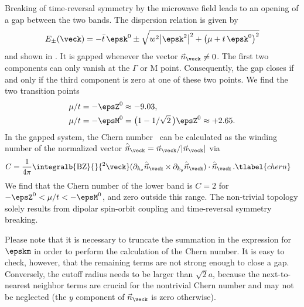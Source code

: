 Breaking of time-reversal symmetry by the microwave field leads to an opening of a gap between the two bands.
The dispersion relation is given by
\begin{align}
    E_\pm(\veck)=- \bar{t}\, \epsk^0 \pm \sqrt{w^2 \big|\epsk^2\big|^2+\big(\mu+t\, \epsk^0\big)^2}
\end{align}
and shown in .
It is gapped whenever the vector $\vec{n}_{\veck}\ne 0$.
The first two components can only vanish at the $\Gamma$ or $\text{M}$ point.
Consequently, the gap closes if and only if the third component is zero at one of these two points.
We find the two transition points
\begin{align}
    \mu/t &= -\epsZ^0 \approx -9.03, \\
    \mu/t &= -\epsM^0 = \big(1-1/\sqrt{2}\,\big)\epsZ^0 \approx +2.65.
\end{align}
In the gapped system, the Chern number~\cite{Hasan2010,Qi2011} can be calculated as the winding number of the normalized vector $\hat{\vec{n}}_\veck = \vec{n}_\veck/|\vec{n}_\veck|$ via
\begin{align}
    C &= \frac{1}{4\pi}\integralb{\text{BZ}}{}{^2\veck} ( \partial_{k_x} \hat{\vec{n}}_{\veck} \times \partial_{k_y} \hat{\vec{n}}_{\veck} ) \cdot \hat{\vec{n}}_{\veck} \, . \tlabel{chern}
\end{align}
We find that the Chern number of the lower band is $C=2$ for $-\epsZ^0 < \mu/t < -\epsM^0$, and zero outside this range.
The non-trivial topology solely results from dipolar spin-orbit coupling and time-reversal symmetry breaking.

Please note that it is necessary to truncate the summation in the expression for $\epskm$ in order to perform the calculation of the Chern number.
It is easy to check, however, that the remaining terms are not strong enough to close a gap.
Conversely, the cutoff radius needs to be larger than $\sqrt{2}a$, because the next-to-nearest neighbor terms are crucial for the nontrivial Chern number and may not be neglected (the $y$ component of $\vec{n}_\veck$ is zero otherwise).

